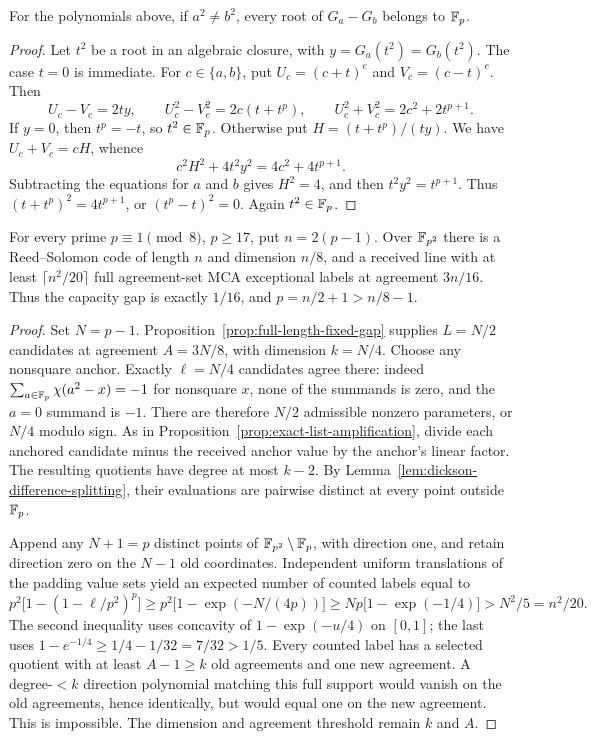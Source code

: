 \begin{lemma}\label{lem:dickson-difference-splitting}
For the polynomials above, if $a^2\ne b^2$, every root of $G_a-G_b$
belongs to $\mathbb F_p$.
\end{lemma}
\begin{proof}
Let $t^2$ be a root in an algebraic closure, with
$y=G_a(t^2)=G_b(t^2)$. The case $t=0$ is immediate. For $c\in\{a,b\}$,
put $U_c=(c+t)^e$ and $V_c=(c-t)^e$. Then
\[
 U_c-V_c=2ty,\qquad U_c^2-V_c^2=2c(t+t^p),\qquad
 U_c^2+V_c^2=2c^2+2t^{p+1}.
\]
If $y=0$, then $t^p=-t$, so $t^2\in\mathbb F_p$. Otherwise put
$H=(t+t^p)/(ty)$. We have $U_c+V_c=cH$, whence
\[
 c^2H^2+4t^2y^2=4c^2+4t^{p+1}.
\]
Subtracting the equations for $a$ and $b$ gives $H^2=4$, and then
$t^2y^2=t^{p+1}$. Thus $(t+t^p)^2=4t^{p+1}$, or
$(t^p-t)^2=0$. Again $t^2\in\mathbb F_p$.
\end{proof}

\begin{corollary}
\label{cor:quadratic-extension-fixed-gap}
For every prime $p\equiv1\pmod8$, $p\ge17$, put $n=2(p-1)$.
Over $\mathbb F_{p^2}$ there is a Reed--Solomon code of length $n$ and dimension
$n/8$, and a received line with at least $\lceil n^2/20\rceil$
full agreement-set MCA exceptional labels at agreement $3n/16$.
Thus the capacity gap is exactly $1/16$, and $p=n/2+1>n/8-1$.
\end{corollary}
\begin{proof}
Set $N=p-1$. Proposition~\ref{prop:full-length-fixed-gap} supplies
$L=N/2$ candidates at agreement $A=3N/8$, with dimension $k=N/4$.
Choose any nonsquare anchor. Exactly $\ell=N/4$ candidates agree there:
indeed $\sum_{a\in\mathbb F_p}\chi(a^2-x)=-1$ for nonsquare $x$, none of
the summands is zero, and the $a=0$ summand is $-1$. There are therefore
$N/2$ admissible nonzero parameters, or $N/4$ modulo sign.
As in Proposition~\ref{prop:exact-list-amplification}, divide each anchored
candidate minus the received anchor value by the anchor's linear factor.
The resulting quotients have degree at most $k-2$. By
Lemma~\ref{lem:dickson-difference-splitting}, their evaluations are pairwise
distinct at every point outside $\mathbb F_p$.

Append any $N+1=p$ distinct points of $\mathbb F_{p^2}\setminus\mathbb F_p$, with
direction one, and retain direction zero on the $N-1$ old coordinates.
Independent uniform translations of the padding value sets yield an
expected number of counted labels equal to
\[
 p^2\bigl[1-(1-\ell/p^2)^p\bigr]
 \ge p^2\bigl[1-\exp(-N/(4p))\bigr]
 \ge Np\bigl[1-\exp(-1/4)\bigr]
 >N^2/5=n^2/20.
\]
The second inequality uses concavity of $1-\exp(-u/4)$ on $[0,1]$;
the last uses $1-e^{-1/4}\ge1/4-1/32=7/32>1/5$.
Every counted label has a selected quotient with at least $A-1\ge k$
old agreements and one new agreement. A degree-$<k$ direction polynomial
matching this full support would vanish on the old agreements, hence
identically, but would equal one on the new agreement. This is impossible.
The dimension and agreement threshold remain $k$ and $A$.
\end{proof}

